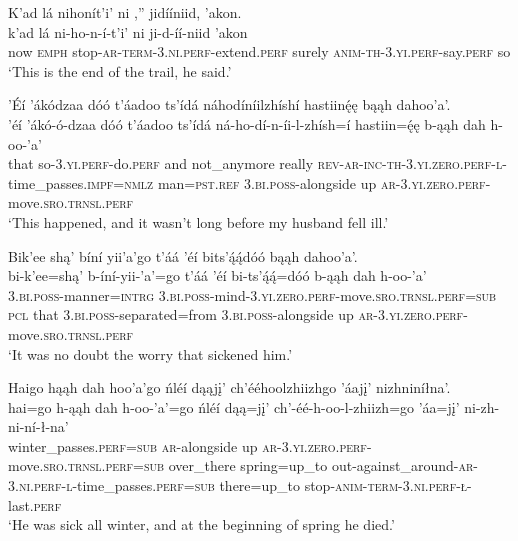 \ea\label{ex:text8-2-14}
K’ad lá nihonít’i’ ni ,'' jidííniid, ’akon.\\
\gll k’ad	lá	ni-ho-n-í-t’i’	ni	ji-d-íí-niid	’akon\\
     now	\textsc{emph}	stop-\textsc{ar}-\textsc{term}-3.\textsc{ni}.\textsc{perf}-extend.\textsc{perf}	surely	\textsc{anim}-\textsc{th}-3.\textsc{yi}.\textsc{perf}-say.\textsc{perf}	so\\
\glt `This is the end of the trail, he said.'
\z

\ea\label{ex:text8-2-15}
’Éí ’ákódzaa dóó t’áadoo ts’ídá náhodíníilzhíshí hastiinę́ę bąąh dahoo’a’.\\
\gll ’éí	’ákó-ó-dzaa	dóó	t’áadoo	ts’ídá	ná-ho-dí-n-íi-l-zhísh=í	hastiin=ę́ę	b-ąąh dah h-oo-’a’\\
     that	so-3.\textsc{yi}.\textsc{perf}-do.\textsc{perf}	and	not\_anymore	really	\textsc{rev}-\textsc{ar}-\textsc{inc}-\textsc{th}-3.\textsc{yi}.\textsc{zero}.\textsc{perf}-\textsc{l}-time\_passes.\textsc{impf}=\textsc{nmlz}	man=\textsc{pst}.\textsc{ref}	3.\textsc{bi}.\textsc{poss}-alongside up \textsc{ar}-3.\textsc{yi}.\textsc{zero}.\textsc{perf}-move.\textsc{sro}.\textsc{trnsl}.\textsc{perf}\\
\glt `This happened, and it wasn't long before my husband fell ill.'
\z

\ea\label{ex:text8-2-16}
Bik’ee shą’ bíní yii’a’go t’áá ’éí bits’ą́ą́dóó bąąh dahoo’a’.\\
\gll bi-k’ee=shą’	b-íní-yii-’a’=go	t’áá ’éí	bi-ts’ą́ą́=dóó	b-ąąh dah h-oo-’a’\\
     3.\textsc{bi}.\textsc{poss}-manner=\textsc{intrg}	3.\textsc{bi}.\textsc{poss}-mind-3.\textsc{yi}.\textsc{zero}.\textsc{perf}-move.\textsc{sro}.\textsc{trnsl}.\textsc{perf}=\textsc{sub}	\textsc{pcl} that	3.\textsc{bi}.\textsc{poss}-separated=from	3.\textsc{bi}.\textsc{poss}-alongside up \textsc{ar}-3.\textsc{yi}.\textsc{zero}.\textsc{perf}-move.\textsc{sro}.\textsc{trnsl}.\textsc{perf}\\
\glt `It was no doubt the worry that sickened him.'
\z

\ea\label{ex:text8-2-17}
Haigo hąąh  dah hoo’a’go ńléí dąąjį’ ch’ééhoolzhiizhgo ’áajį’ nizhniníłna’.\\
\gll hai=go	h-ąąh dah h-oo-’a’=go	ńléí	dąą=jį’	ch’-éé-h-oo-l-zhiizh=go	’áa=jį’	ni-zh-ni-ní-ł-na’\\
     winter\_passes.\textsc{perf}=\textsc{sub}	\textsc{ar}-alongside up \textsc{ar}-3.\textsc{yi}.\textsc{zero}.\textsc{perf}-move.\textsc{sro}.\textsc{trnsl}.\textsc{perf}=\textsc{sub}	over\_there	spring=up\_to	out-against\_around-\textsc{ar}-3.\textsc{ni}.\textsc{perf}-\textsc{l}-time\_passes.\textsc{perf}=\textsc{sub}	there=up\_to	stop-\textsc{anim}-\textsc{term}-3.\textsc{ni}.\textsc{perf}-\textsc{ł}-last.\textsc{perf}\\
\glt `He was sick all winter, and at the beginning of spring he died.'
\z

